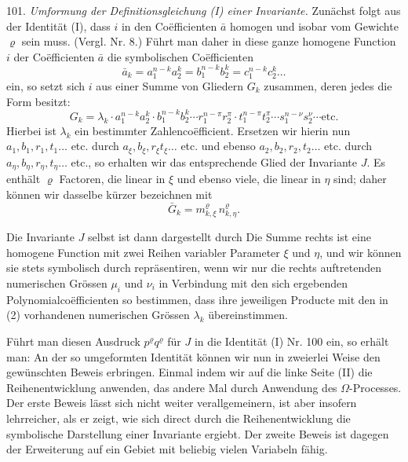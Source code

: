 101. \textit{Umformung der Definitionsgleichung (I) einer Invariante.} Zunächst
 folgt aus der Identität (I), dass $i$ in den Co\"efficienten $\bar{a}$ homogen
und isobar vom Gewichte $\varrho$ sein muss. (Vergl. Nr. 8.) Führt man
daher in diese ganze homogene Function $i$ der Co\"efficienten $\bar{a}$ die
symbolischen Co\"efficienten
\[
\bar{a}_k = a_1^{n-k}a_2^k = b_1^{n-k}b_2^k = c_1^{n-k}c_2^k \ldots
\]
ein, so setzt sich $i$ aus einer Summe von Gliedern $G_k$ zusammen,
deren jedes die Form besitzt:
\[
G_k = \lambda_k \cdot a_1^{n-k}a_2^k \cdot b_1^{n-k}b_2^k \cdots r_1^{n-\pi}r_2^\pi \cdot t_1^{n-\pi}t_2^\pi \cdots s_1^{n-\nu}s_2^\nu \cdots \text{etc.}
\]
Hierbei ist $\lambda_k$ ein bestimmter Zahlenco\"efficient. Ersetzen wir hierin
nun $a_1, b_1, r_1, t_1 \ldots$ etc. durch $a_\xi, b_\xi, r_\xi t_\xi \ldots$ etc. und ebenso $a_2,
b_2, r_2, t_2 \ldots$ etc. durch $a_\eta, b_\eta, r_\eta, t_\eta \ldots$ etc., so erhalten wir das entsprechende
 Glied
der Invariante $J$. Es enthält $\varrho$ Factoren, die linear in $\xi$ und ebenso
viele, die linear in $\eta$ sind; daher können wir dasselbe kürzer bezeichnen
 mit
\[
\bar{G}_k = m^\varrho_{k,\xi}\,n^\varrho_{k,\eta}.
\]


Die Invariante $J$ selbst ist dann dargestellt durch
Die Summe rechts ist eine homogene Function mit zwei Reihen
variabler Parameter $\xi$ und $\eta$, und wir können sie stets symbolisch
durch
repräsentiren, wenn wir nur die rechts auftretenden numerischen Grössen
$\mu_i$ und $\nu_i$ in Verbindung mit den sich ergebenden Polynomialco\"efficienten
 so bestimmen, dass ihre jeweiligen Producte mit den in (2) vorhandenen
 numerischen Grössen $\lambda_k$ übereinstimmen.

Führt man diesen Ausdruck $p^\varrho q^\varrho$ für $J$ in die Identität (I) Nr. 100
ein, so erhält man:
An der so umgeformten Identität können wir nun in zweierlei
Weise den gewünschten Beweis erbringen. Einmal indem wir auf die
linke Seite (II) die Reihenentwicklung anwenden, das andere Mal
durch Anwendung des $\Omega$-Processes. Der erste Beweis lässt sich nicht
weiter verallgemeinern, ist aber insofern lehrreicher, als er zeigt, wie
sich direct durch die Reihenentwicklung die symbolische Darstellung
einer Invariante ergiebt. Der zweite Beweis ist dagegen der Erweiterung
 auf ein Gebiet mit beliebig vielen Variabeln fähig.

